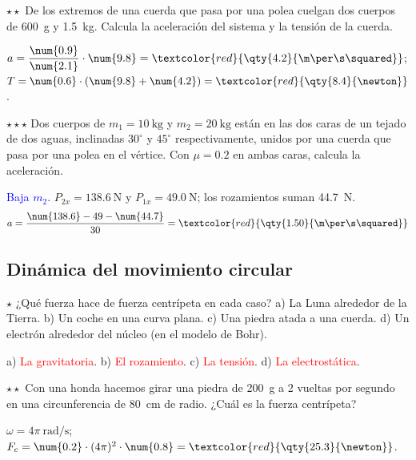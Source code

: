 \begin{exercise}
    \(\star\star\) De los extremos de una cuerda que pasa por una polea cuelgan dos cuerpos de \qty{600}{\g} y \qty{1.5}{\kg}. Calcula
    la aceleración del sistema y la tensión de la cuerda.
    \begin{solu}
        \(a = \dfrac{\num{0.9}}{\num{2.1}} \cdot \num{9.8} = \textcolor{red}{\qty{4.2}{\m\per\s\squared}}\); \(T = \num{0.6} \cdot (\num{9.8} + \num{4.2})
        = \textcolor{red}{\qty{8.4}{\newton}}\).
    \end{solu}
\end{exercise}

\begin{exercise}
    \(\star\star\star\) Dos cuerpos de \(m_1 = \qty{10}{\kg}\) y \(m_2 = \qty{20}{\kg}\) están en las dos caras de un tejado de dos aguas,
    inclinadas \(30^\circ\) y \(45^\circ\) respectivamente, unidos por una cuerda que pasa por una polea en el vértice. Con \(\mu = \num{0.2}\)
    en ambas caras, calcula la aceleración.
    \begin{solu}
        \textcolor{blue}{Baja \(m_2\).} \(P_{2x} = \qty{138.6}{\newton}\) y \(P_{1x} = \qty{49.0}{\newton}\); los rozamientos suman
        \qty{44.7}{\newton}.
        \[ a = \frac{\num{138.6} - 49 - \num{44.7}}{30} = \textcolor{red}{\qty{1.50}{\m\per\s\squared}} \]
    \end{solu}
\end{exercise}

\subsection{Dinámica del movimiento circular}

\begin{exercise}
    \(\star\) ¿Qué fuerza hace de fuerza centrípeta en cada caso? a) La Luna alrededor de la Tierra. b) Un coche en una curva plana.
    c) Una piedra atada a una cuerda. d) Un electrón alrededor del núcleo (en el modelo de Bohr).
    \begin{solu}
        a) \textcolor{red}{La gravitatoria}. b) \textcolor{red}{El rozamiento}. c) \textcolor{red}{La tensión}. d) \textcolor{red}{La
        electrostática}.
    \end{solu}
\end{exercise}

\begin{exercise}
    \(\star\star\) Con una honda hacemos girar una piedra de \qty{200}{\g} a 2 vueltas por segundo en una circunferencia de \qty{80}{\cm}
    de radio. ¿Cuál es la fuerza centrípeta?
    \begin{solu}
        \(\omega = 4\pi~\unit{\radian\per\s}\); \(F_c = \num{0.2} \cdot (4\pi)^2 \cdot \num{0.8} = \textcolor{red}{\qty{25.3}{\newton}}\).
    \end{solu}
\end{exercise}

